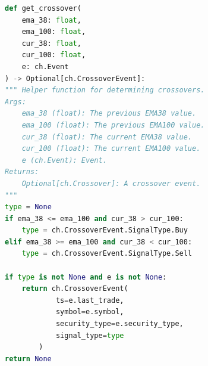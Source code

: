 \begin{minipage}{0.9\linewidth}
\begin{lstlisting}[caption={Query 2}, label={lst:createDataFrame4},language=Python]
def get_crossover(
    ema_38: float,
    ema_100: float,
    cur_38: float,
    cur_100: float,
    e: ch.Event
) -> Optional[ch.CrossoverEvent]:
""" Helper function for determining crossovers.
Args:
    ema_38 (float): The previous EMA38 value.
    ema_100 (float): The previous EMA100 value.
    cur_38 (float): The current EMA38 value.
    cur_100 (float): The current EMA100 value.
    e (ch.Event): Event.
Returns:
    Optional[ch.Crossover]: A crossover event.
"""
type = None
if ema_38 <= ema_100 and cur_38 > cur_100:
    type = ch.CrossoverEvent.SignalType.Buy
elif ema_38 >= ema_100 and cur_38 < cur_100:
    type = ch.CrossoverEvent.SignalType.Sell

if type is not None and e is not None:
    return ch.CrossoverEvent(
            ts=e.last_trade,
            symbol=e.symbol,
            security_type=e.security_type,
            signal_type=type
        )    
return None
\end{lstlisting}
\end{minipage}







        
